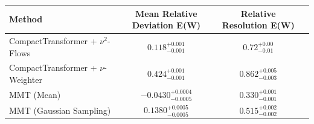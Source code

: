     \begin{tabular}{lccc}
        \toprule
        Method & Mean Relative Deviation E(W) & Relative Resolution E(W) \\
        \midrule
        CompactTransformer + $\nu^2$-Flows & $0.118_{-0.001}^{+0.001}$ & $0.72_{-0.01}^{+0.00}$ \\
        CompactTransformer + $\nu$-Weighter & $0.424_{-0.001}^{+0.001}$ & $0.862_{-0.003}^{+0.005}$ \\
        MMT (Mean) & $-0.0430_{-0.0005}^{+0.0004}$ & $0.330_{-0.001}^{+0.001}$ \\
        MMT (Gaussian Sampling) & $0.1380_{-0.0005}^{+0.0005}$ & $0.515_{-0.002}^{+0.002}$ \\
        \bottomrule
    \end{tabular}